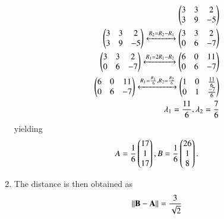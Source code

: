 \begin{enumerate}[label=\thesection.\arabic*.,ref=\thesection.\theenumi]
\begin{align}
    \begin{pmatrix}3 & 3 &2\\ 3 & 9 & -5\end{pmatrix}\\
    \begin{pmatrix}3 & 3 &2\\ 3 & 9 & -5\end{pmatrix}\xleftrightarrow{R_2=R_2-R_1}\begin{pmatrix}3 & 3 &2\\ 0 & 6 & -7\end{pmatrix}\\
    \begin{pmatrix}3 & 3 &2\\ 0 & 6 & -7\end{pmatrix}\xleftrightarrow{R_1=2R_1-R_2}\begin{pmatrix}6 & 0 & 11\\ 0 & 6 & -7\end{pmatrix}\\
    \begin{pmatrix}6 & 0 & 11\\ 0 & 6 & -7\end{pmatrix}\xleftrightarrow{R_1=\frac{R_1}{6},R_2=\frac{R_2}{6}}\begin{pmatrix}1 & 0 & \frac{11}{6}\\ 0 & 1 & \frac{-7}{6}\end{pmatrix}\\
    \lambda_1=\frac{11}{6},\lambda_2=\frac{7}{6}
\end{align}
yielding
\begin{align}
A=\frac{1}{6}\begin{pmatrix}17\\1\\17\end{pmatrix},
B=\frac{1}{6}\begin{pmatrix}26\\1\\8\end{pmatrix}. 
\end{align}
%
\item The distance is then obtained as
\begin{align}
    \left\lVert\mathbf{B}-\mathbf{A}\right\rVert 
    =\frac{3}{\sqrt{2}}
\end{align}
%

\end{enumerate}
